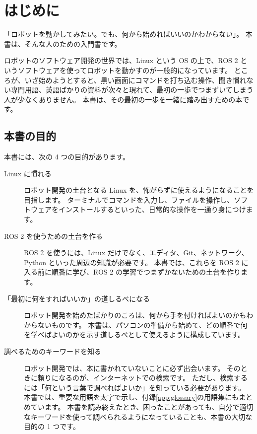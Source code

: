 \chapter{はじめに}

「ロボットを動かしてみたい。でも、何から始めればいいのかわからない」。
本書は、そんな人のための入門書です。

ロボットのソフトウェア開発の世界では、Linux という OS の上で、ROS 2 というソフトウェアを使ってロボットを動かすのが一般的になっています。
ところが、いざ始めようとすると、黒い画面にコマンドを打ち込む操作、聞き慣れない専門用語、英語ばかりの資料が次々と現れて、最初の一歩でつまずいてしまう人が少なくありません。
本書は、その最初の一歩を一緒に踏み出すための本です。

\section*{本書の目的}

本書には、次の 4 つの目的があります。

\begin{description}
  \item[Linux に慣れる]
    ロボット開発の土台となる Linux を、怖がらずに使えるようになることを目指します。
    ターミナルでコマンドを入力し、ファイルを操作し、ソフトウェアをインストールするといった、日常的な操作を一通り身につけます。
  \item[ROS 2 を使うための土台を作る]
    ROS 2 を使うには、Linux だけでなく、エディタ、Git、ネットワーク、Python といった周辺の知識が必要です。
    本書では、これらを ROS 2 に入る前に順番に学び、ROS 2 の学習でつまずかないための土台を作ります。
  \item[「最初に何をすればいいか」の道しるべになる]
    ロボット開発を始めたばかりのころは、何から手を付ければよいのかもわからないものです。
    本書は、パソコンの準備から始めて、どの順番で何を学べばよいのかを示す道しるべとして使えるように構成しています。
  \item[調べるためのキーワードを知る]
    ロボット開発では、本に書かれていないことに必ず出会います。
    そのときに頼りになるのが、インターネットでの検索です。
    ただし、検索するには「何という言葉で調べればよいか」を知っている必要があります。
    本書では、重要な用語を太字で示し、付録\ref{app:glossary}の用語集にもまとめています。
    本書を読み終えたとき、困ったことがあっても、自分で適切なキーワードを使って調べられるようになっていることも、本書の大切な目的の 1 つです。
\end{description}

